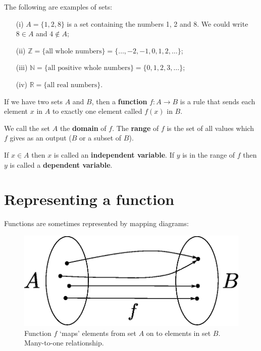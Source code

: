 \begin{example}
The following are examples of sets:
\begin{itemize}
\item[(i)] $A=\{1,2,8\}$ is a set containing the numbers 1, 2 and 8. We could write \(8\in A\) and \(4\not\in A\);
\item[(ii)] $\mathbb{Z}=\{\text{all whole numbers}\}=\{\dots,-2,-1,0,1,2,\dots\}$;
\item[(iii)] $\mathbb{N}=\{\text{all positive whole numbers}\}=\{0,1,2,3,\dots\}$;
\item[(iv)] $\mathbb{R}=\{\text{all real numbers}\}.$
\end{itemize}
\end{example}

\begin{definition}
If we have two sets $A$ and $B$, then a \textbf{function} $f:A\rightarrow B$ is a rule that sends each element $x$ in $A$ to exactly one element called $f(x)$ in $B$.

We call the set $A$ the \textbf{domain} of $f$. The \textbf{range} of $f$ is the set of all values which $f$ gives as an output ($B$ or a subset of $B$).

If $x\in A$ then $x$ is called an \textbf{independent variable}.
If $y$ is in the range of $f$ then $y$ is called a \textbf{dependent variable}.

\end{definition}

\section{Representing a function}
Functions are sometimes represented by mapping diagrams:
\begin{figure}[H]
\centering
\includegraphics[scale=0.75]{img/function-set}
\captionstyle{\centering\it}
\caption{Function $f$ `maps' elements from set $A$ on to elements in set $B$. Many-to-one relationship. }
\label{fig:function-set}
\end{figure}

